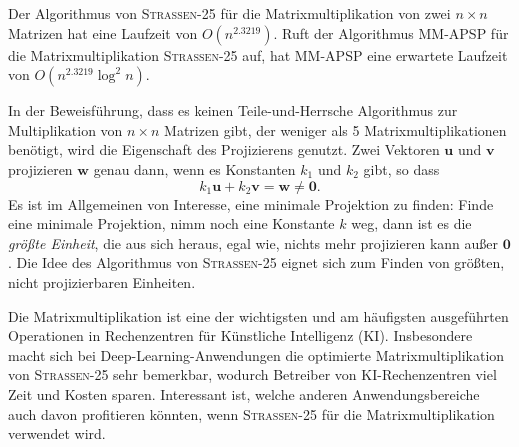 \documentclass{scrartcl}
\numberwithin{equation}{section}
\begin{document}
Der Algorithmus von \textsc{Strassen-25} für die Matrixmultiplikation von zwei $n \times n$ Matrizen hat eine Laufzeit von $O(n^{2.3219})$. Ruft der Algorithmus MM-APSP für die Matrixmultiplikation \textsc{Strassen-25} auf, hat MM-APSP eine erwartete Laufzeit von $O(n^{2.3219} \log^2 n)$. 

In der Beweisführung, dass es keinen Teile-und-Herrsche Algorithmus zur Multiplikation von $n \times n$ Matrizen gibt, der weniger als 5 Matrixmultiplikationen benötigt, wird die Eigenschaft des Projizierens genutzt. Zwei Vektoren $\boldsymbol{u}$ und $\boldsymbol{v}$ projizieren $\boldsymbol{w}$ genau dann, wenn es Konstanten $k_1$ und $k_2$ gibt, so dass $$k_1 \boldsymbol{u} + k_2\boldsymbol{v} = \boldsymbol{w} \neq \boldsymbol{0}.$$ Es ist im Allgemeinen von Interesse, eine minimale Projektion zu finden: Finde eine minimale Projektion, nimm noch eine Konstante $k$ weg, dann ist es die \textit{größte Einheit}, die aus sich heraus, egal wie, nichts mehr projizieren kann außer $\boldsymbol{0}$. Die Idee des Algorithmus von \textsc{Strassen-25} eignet sich zum Finden von größten, nicht projizierbaren Einheiten.

Die Matrixmultiplikation ist eine der wichtigsten und am häufigsten ausgeführten Operationen in Rechenzentren für Künstliche Intelligenz (KI). Insbesondere macht sich bei Deep-Learning-Anwendungen die optimierte Matrixmultiplikation von \textsc{Strassen-25} sehr bemerkbar, wodurch Betreiber von KI-Rechenzentren viel Zeit und Kosten sparen. Interessant ist, welche anderen Anwendungsbereiche auch davon profitieren könnten, wenn \textsc{Strassen-25} für die Matrixmultiplikation verwendet wird.
\end{document}
